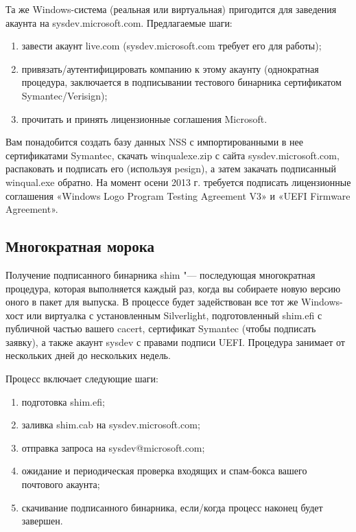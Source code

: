 \documentclass[10pt, a5paper]{article}
\begin{document}
Та же Windows-система (реальная или виртуальная) пригодится для заведения акаунта на  sysdev.mi\-cro\-soft.com. Предлагаемые шаги:

\begin{enumerate}
  \item завести акаунт live.com (sysdev.microsoft.com требует его для работы);
  \item привязать/аутентифицировать компанию к этому акаунту (однократная процедура, заключается в подписывании тестового бинарника сертификатом Symantec/Verisign);
  \item прочитать и принять лицензионные соглашения Microsoft.
\end{enumerate}

Вам понадобится создать базу данных NSS с импортированными в нее сертификатами Symantec, скачать winqualexe.zip с сайта sysdev.microsoft.com, распаковать и подписать его (используя pesign), а затем закачать подписанный winqual.exe обратно. На момент осени 2013 г. требуется подписать лицензионные соглашения «Windows Logo Program Testing Agreement V3» и «UEFI Firmware Agreement».

\subsection*{Многократная морока}

Получение подписанного бинарника shim "--- последующая многократная процедура, которая выполняется каждый раз, когда вы собираете новую версию оного в пакет для выпуска. В процессе будет задействован все тот же Windows-хост или виртуалка с установленным Silverlight, подготовленный shim.efi с публичной частью вашего  cacert, сертификат Symantec (чтобы подписать заявку), а также акаунт sysdev с правами подписи UEFI.  Процедура занимает от нескольких дней до нескольких недель.

Процесс включает следующие шаги:

\begin{enumerate}
  \item подготовка shim.efi;
  \item заливка shim.cab на sysdev.microsoft.com;
  \item отправка запроса на sysdev@microsoft.com;
  \item ожидание и периодическая проверка входящих и спам-бокса вашего почтового акаунта;
  \item скачивание подписанного бинарника, если/когда процесс наконец будет завершен.
\end{enumerate}
\end{document}
